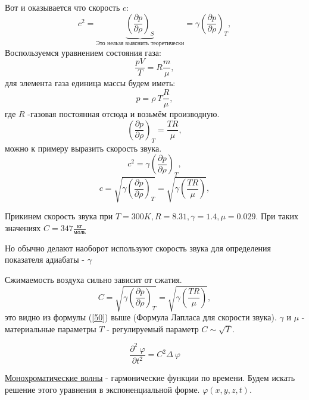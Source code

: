 \documentclass[14pt,a4paper,oneside]{extarticle}	%
\newcommand{\bracket}[1] {\left( #1 \right) } %
\newcommand{\dd}[1] {\partial #1 }
\begin{document}
Вот и оказывается что скорость $ c $:
\begin{equation*}
c^{2} = \underbrace{\bracket{\frac{\dd{p}}{\dd{\rho}}}_{S}}_{\text{Это нельзя выяснить теоретически}} = \gamma\bracket{\frac{\dd{p}}{\dd{\rho}}}_{T},
\end{equation*}
Воспользуемся уравнением состояния газа:
\begin{equation}\label{46}
\frac{pV}{T} = R\frac{m}{\mu},
\end{equation}
для элемента газа единица массы будем иметь:
\begin{equation}\label{47}
p = \rho\: T\frac{R}{\mu},
\end{equation} 
где $ R $ -газовая постоянная 
отсюда и возьмём производную.
\begin{equation}\label{48}
\bracket{\frac{\dd{p}}{\dd{\rho}}}_{T} = \frac{TR}{\mu},
\end{equation} 
можно к примеру выразить скорость звука.
\begin{equation*}
c^{2} = \gamma\bracket{\frac{\dd{p}}{\dd{\rho}}}_{T},
\end{equation*}
\begin{equation}\label{50}
c = \sqrt{\gamma\bracket{\frac{\dd{p}}{\dd{\rho}}}_{T}} = \sqrt{\gamma\bracket{\frac{TR}{\mu}}},
\end{equation}
 
Прикинем скорость звука при $ T = 300K, R = 8.31, \gamma = 1.4, \mu = 0.029$.
При таких значениях $ C = 347 \frac{\text{кг}}{\text{моль}}$

Но обычно делают наоборот используют скорость звука для определения показателя адиабаты - $ \gamma $  

Сжимаемость воздуха сильно зависит от сжатия.
\begin{equation*}
C = \sqrt{\gamma\bracket{\frac{\dd{p}}{\dd{\rho}}}_{T}} = \sqrt{\gamma\bracket{\frac{TR}{\mu}}},
\end{equation*}
это видно из формулы (\ref{50}) выше  (Формула Лапласа для скорости звука).
$ \gamma $ и $ \mu $ - материальные параметры
$ T $ - регулируемый параметр $ C \sim \sqrt{T} $.

\begin{equation}\label{51}
\frac{\dd{^{2}\:\varphi}}{\dd{t^{2}}} = C^{2}\Delta\:\varphi
\end{equation}

\underline{Монохроматические волны} - гармонические функции по времени. Будем искать решение этого уравнения в экспоненциальной форме.
$ \varphi(x,y,z,t) $.
\end{document}
